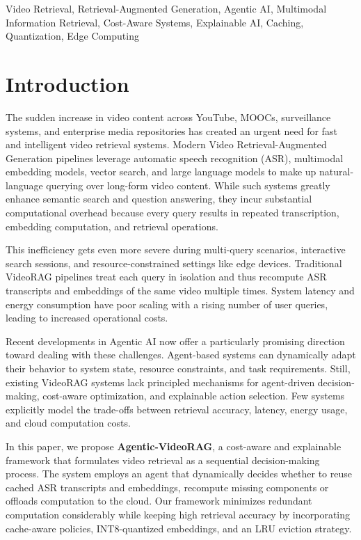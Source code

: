 \documentclass[conference,twocolumn]{IEEEtran}
\begin{document}
\begin{IEEEkeywords}
Video Retrieval, Retrieval-Augmented Generation, Agentic AI, Multimodal Information Retrieval, Cost-Aware Systems, Explainable AI, Caching, Quantization, Edge Computing
\end{IEEEkeywords}

\section{Introduction}
The sudden increase in video content across YouTube, MOOCs, surveillance systems, and enterprise media repositories has created an urgent need for fast and intelligent video retrieval systems. Modern Video Retrieval-Augmented Generation pipelines leverage automatic speech recognition (ASR), multimodal embedding models, vector search, and large language models to make up natural-language querying over long-form video content. While such systems greatly enhance semantic search and question answering, they incur substantial computational overhead because every query results in repeated transcription, embedding computation, and retrieval operations.

This inefficiency gets even more severe during multi-query scenarios, interactive search sessions, and resource-constrained settings like edge devices. Traditional VideoRAG pipelines treat each query in isolation and thus recompute ASR transcripts and embeddings of the same video multiple times. System latency and energy consumption have poor scaling with a rising number of user queries, leading to increased operational costs.

Recent developments in Agentic AI now offer a particularly promising direction toward dealing with these challenges. Agent-based systems can dynamically adapt their behavior to system state, resource constraints, and task requirements. Still, existing VideoRAG systems lack principled mechanisms for agent-driven decision-making, cost-aware optimization, and explainable action selection. Few systems explicitly model the trade-offs between retrieval accuracy, latency, energy usage, and cloud computation costs.

In this paper, we propose \textbf{Agentic-VideoRAG}, a cost-aware and explainable framework that formulates video retrieval as a sequential decision-making process. The system employs an agent that dynamically decides whether to reuse cached ASR transcripts and embeddings, recompute missing components or offloads computation to the cloud. Our framework minimizes redundant computation considerably while keeping high retrieval accuracy by incorporating cache-aware policies, INT8-quantized embeddings, and an LRU eviction strategy.
\end{document}
